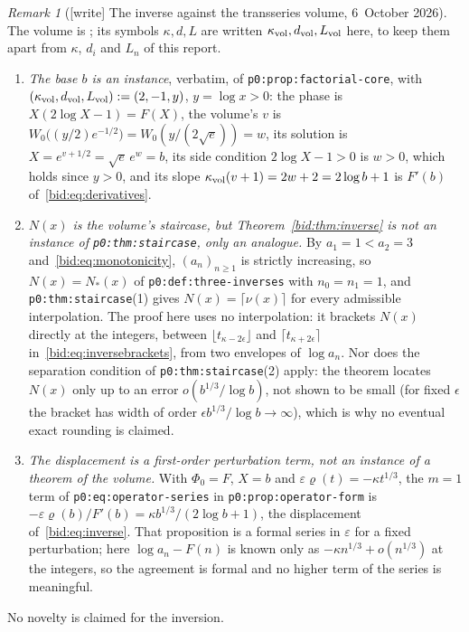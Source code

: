 \documentclass[11pt,letterpaper]{article}
\numberwithin{equation}{section}
\theoremstyle{remark}\newtheorem{remark}[theorem]{Remark}
\newcommand{\file}[1]{\nolinkurl{#1}}
\begin{document}
\begin{remark}[{[write]} The inverse against the transseries volume, 6~October 2026]\label{bid:rem:transseries}
The volume is
;
its symbols $\kappa,d,L$ are written $\kappa_{\rm vol},d_{\rm vol},L_{\rm vol}$
here, to keep them apart from $\kappa$, $d_i$ and $L_n$ of this report.
\begin{enumerate}
\item[(a)] \emph{The base $b$ is an instance}, verbatim, of
 \file{p0:prop:factorial-core}, with
 $(\kappa_{\rm vol},d_{\rm vol},L_{\rm vol}):=(2,-1,y)$, $y=\log x>0$: the
 phase is $X(2\log X-1)=F(X)$, the volume's $v$ is
 $W_0\bigl((y/2)e^{-1/2}\bigr)=W_0(y/(2\sqrt e))=w$, its solution is
 $X=e^{v+1/2}=\sqrt e\,e^w=b$, its side condition $2\log X-1>0$ is $w>0$,
 which holds since $y>0$, and its slope $\kappa_{\rm vol}(v+1)=2w+2=2\log b+1$
 is $F'(b)$ of~\eqref{bid:eq:derivatives}.
\item[(b)] \emph{$N(x)$ is the volume's staircase, but
 Theorem~\ref{bid:thm:inverse} is not an instance of
 \file{p0:thm:staircase}, only an analogue.} By $a_1=1<a_2=3$
 and~\eqref{bid:eq:monotonicity}, $(a_n)_{n\ge1}$ is strictly increasing, so
 $N(x)=N_\ast(x)$ of \file{p0:def:three-inverses} with $n_0=n_1=1$, and
 \file{p0:thm:staircase}(1) gives $N(x)=\lceil\nu(x)\rceil$ for every
 admissible interpolation. The proof here uses no interpolation: it brackets
 $N(x)$ directly at the integers, between $\lfloor t_{\kappa-2\epsilon}\rfloor$
 and $\lceil t_{\kappa+2\epsilon}\rceil$ in~\eqref{bid:eq:inversebrackets},
 from two envelopes of $\log a_n$. Nor does the separation condition of
 \file{p0:thm:staircase}(2) apply: the theorem locates $N(x)$ only up to an
 error $o(b^{1/3}/\log b)$, not shown to be small (for fixed $\epsilon$ the
 bracket has width of order $\epsilon b^{1/3}/\log b\to\infty$), which is why
 no eventual exact rounding is claimed.
\item[(c)] \emph{The displacement is a first-order perturbation term, not an
 instance of a theorem of the volume.} With $\Phi_0=F$, $X=b$ and
 $\varepsilon\varrho(t)=-\kappa t^{1/3}$, the $m=1$ term of
 \file{p0:eq:operator-series} in \file{p0:prop:operator-form} is
 $-\varepsilon\varrho(b)/F'(b)=\kappa b^{1/3}/(2\log b+1)$, the displacement
 of~\eqref{bid:eq:inverse}. That proposition is a formal series in
 $\varepsilon$ for a fixed perturbation; here $\log a_n-F(n)$ is known only as
 $-\kappa n^{1/3}+o(n^{1/3})$ at the integers, so the agreement is formal and
 no higher term of the series is meaningful.
\end{enumerate}
No novelty is claimed for the inversion.
\end{remark}
\end{document}
